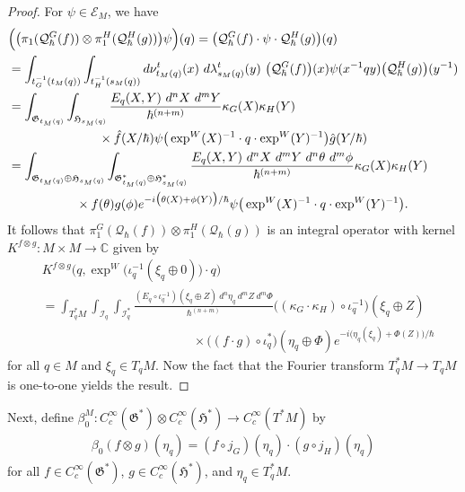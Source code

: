\documentclass[sn-mathphys,Numbered]{sn-jnl}
\begin{document}
\begin{proof}
    For $\psi\in\mathcal{E}_M$, we have
    \begin{align}
        &\Big(\big(\pi_1(\mathcal{Q}_\hbar^G(f))\otimes\pi_1^H(\mathcal{Q}_\hbar^H(g))\big)\psi\Big)(q) = \big(\mathcal{Q}_\hbar^G(f)\cdot \psi\cdot \mathcal{Q}_\hbar^H(g)\big)(q)\\
        &= \int_{t_G^{-1}(t_M(q))}\int_{t_H^{-1}(s_M(q))} d\nu^t_{t_M(q)}(x)\ d\lambda^t_{s_M(q)}(y)\ \big(\mathcal{Q}_\hbar^G(f)\big)(x)\psi(x^{-1}qy)\big(\mathcal{Q}_\hbar^H(g)\big)(y^{-1})\\
        &= \int_{\mathfrak{G}_{t_M(q)}}\int_{\mathfrak{H}_{s_M(q)}} \frac{E_q(X,Y)\ d^nX\ d^mY}{\hbar^{(n+m)}}\kappa_G(X)\kappa_H(Y)\\
        &\hspace{1in} \times \hat{f}(X/\hbar)\psi\big(\exp^W(X)^{-1}\cdot q\cdot \exp^W(Y)^{-1}\big)\hat{g}(Y/\hbar)\\
        &= \int_{\mathfrak{G}_{t_M(q)}\oplus \mathfrak{H}_{s_M(q)}}\int_{\mathfrak{G}^*_{t_M(q)}\oplus \mathfrak{H}^*_{s_M(q)}}\frac{E_q(X,Y)\ d^nX\ d^mY\ d^n\theta\ d^m\phi}{\hbar^{(n+m)}}\kappa_G(X)\kappa_H(Y)\\
        &\hspace{.75in}\times f(\theta)g(\phi)e^{-i\big(\theta(X)+\phi(Y)\big)/\hbar}\psi\big(\exp^W(X)^{-1}\cdot q\cdot \exp^W(Y)^{-1}\big).
     \end{align}
     It follows that $\pi_1^G(\mathcal{Q}_\hbar(f))\otimes\pi_1^H(\mathcal{Q}_\hbar(g))$ is an integral operator with kernel $K^{f\otimes g}: M\times M\to \mathbb{C}$ given by
     \begin{align}
        &K^{f\otimes g}\Big(q,\exp^W\big(\iota_q^{-1}(\xi_q\oplus 0)\big)\cdot q\Big)\\ &= \int_{T^*_qM}\int_{\mathcal{I}_q}\int_{\mathcal{I}_q^*} \frac{(E_q\circ\iota_q^{-1})(\xi_q\oplus Z)\ d^n\eta_q\ d^m Z\ d^m\Phi}{\hbar^{(n+m)}} \big((\kappa_G\cdot\kappa_H)\circ\iota_q^{-1}\big)(\xi_q\oplus Z)\\
        &\hspace{2in}\times \big((f\cdot g)\circ\iota_q^*\big)(\eta_q\oplus \Phi)e^{-i\big(\eta_q(\xi_q)+\Phi(Z)\big)/\hbar}
     \end{align}
for all $q\in M$ and $\xi_q\in T_qM$.  Now the fact that the Fourier transform $T_q^*M\to T_qM$ is one-to-one yields the result.\bigskip
\end{proof}

Next, define $\beta^M_0: C_c^\infty(\mathfrak{G}^*)\otimes C_c^\infty(\mathfrak{H}^*)\to C_c^\infty(T^*M)$ by
\begin{align}
    \beta_0(f\otimes g)(\eta_q) = (f\circ j_G)(\eta_q)\cdot (g\circ j_H)(\eta_q)
\end{align}
for all $f\in C_c^\infty(\mathfrak{G}^*)$, $g\in C_c^\infty(\mathfrak{H}^*)$, and $\eta_q\in T^*_qM$.
\end{document}
